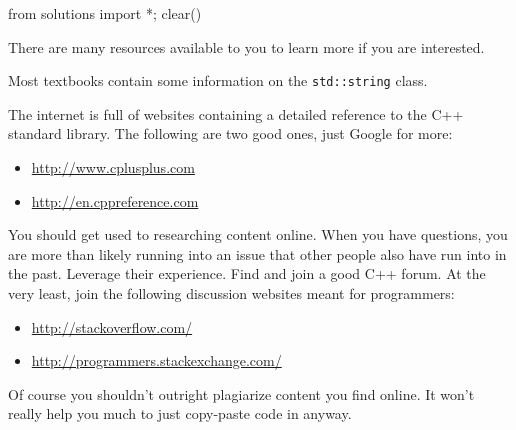 \begin{python0}
from solutions import *; clear()
\end{python0}

There are many resources available to you to learn more if you are
interested.

Most textbooks contain some information on the \texttt{std::string} class.

The internet is full of websites containing a detailed reference to the
C++ standard library. The following are two good ones, just Google for
more:

\begin{itemize}
\item
  \href{http://www.cplusplus.com/}{http://www.cplusplus.com}
\item
  \href{http://en.cppreference.com/}{http://en.cppreference.com}
\end{itemize}

You should get used to researching content online. When you have
questions, you are more than likely running into an issue that other
people also have run into in the past. Leverage their experience. Find
and join a good C++ forum. At the very least, join the following
discussion websites meant for programmers:

\begin{itemize}
\item
  \url{http://stackoverflow.com/}
\item
  \url{http://programmers.stackexchange.com/}
\end{itemize}

Of course you shouldn't outright plagiarize content you find online. It won't really help you much to just copy-paste code in anyway.

